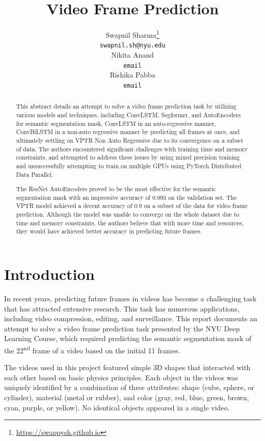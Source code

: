 \documentclass{article}
\title{Video Frame Prediction}
\author{%
  Swapnil Sharma\thanks{\url{https://swappysh.github.io}} \\
  \texttt{swapnil.sh@nyu.edu} \\
  \And
  Nikita Anand \\
  \texttt{email} \\
  \And
  Rishika Pabba \\
  \texttt{email} \\
}
\begin{document}
\maketitle


\begin{abstract}
  This abstract details an attempt to solve a video frame prediction task by utilizing various 
models and techniques, including ConvLSTM, Segformer, and AutoEncoders for semantic segmentation 
mask, ConvLSTM in an auto-regressive manner, ConvBiLSTM in a non-auto regressive manner by 
predicting all frames at once, and ultimately settling on VPTR Non Auto Regressive due to its 
convergence on a subset of data. The authors encountered significant challenges with training 
time and memory constraints, and attempted to address these issues by using mixed precision 
training and unsuccessfully attempting to train on multiple GPUs using PyTorch Distributed Data 
Parallel.

The ResNet AutoEncoders proved to be the most effective for the semantic segmentation mask with 
an impressive accuracy of 0.993 on the validation set. The VPTR model achieved a decent accuracy 
of 0.9 on a subset of the data for video frame prediction. Although the model was unable to 
converge on the whole dataset due to time and memory constraints, the authors believe that with 
more time and resources, they would have achieved better accuracy in predicting future frames.
\end{abstract}

\section{Introduction}
In recent years, predicting future frames in videos has become a challenging task that has 
attracted extensive research. This task has numerous applications, including video compression, 
editing, and surveillance. This report documents an attempt to solve a video frame prediction 
task presented by the NYU Deep Learning Course, which required predicting the semantic 
segmentation mask of the 22\textsuperscript{nd} frame of a video based on the initial 11 
frames.

The videos used in this project featured simple 3D shapes that interacted with each other 
based on basic physics principles. Each object in the videos was uniquely identified by a 
combination of three attributes: shape (cube, sphere, or cylinder), material (metal or rubber), 
and color (gray, red, blue, green, brown, cyan, purple, or yellow). No identical objects 
appeared in a single video.
\end{document}
